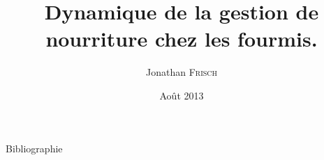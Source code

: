 \documentclass[a4paper,oneside]{memoir}
\title{Dynamique de la gestion de nourriture chez les fourmis.}
\date{Août 2013}
\author{Jonathan \textsc{Frisch}}
\begin{document}

\tableofcontents











%


Bibliographie
\newpage


\end{document}
